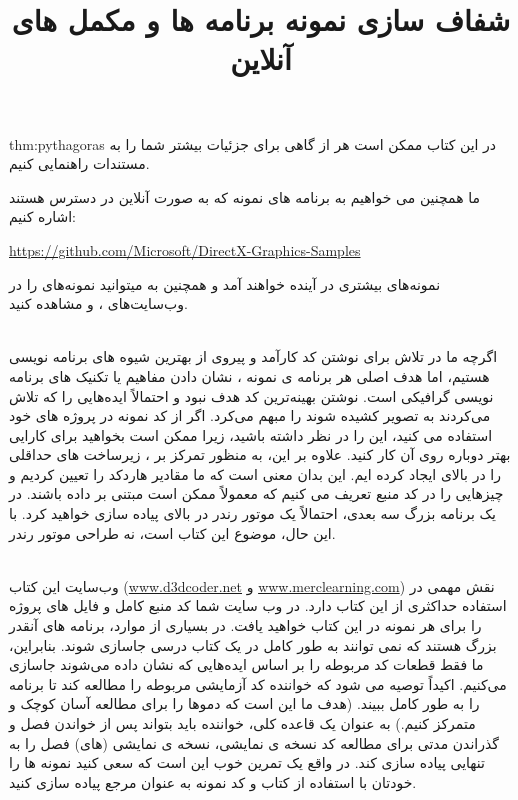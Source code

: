 {    \begin{theo}{thm:pythagoras}
        در این کتاب ممکن است هر از گاهی برای جزئیات بیشتر شما را به مستندات راهنمایی کنیم.
    \end{theo}
    ما همچنین می خواهیم به برنامه های نمونه  که به صورت آنلاین در دسترس هستند اشاره کنیم:

    \begin{flushleft}
        \href{https://github.com/Microsoft/DirectX-Graphics-Samples}{https://github.com/Microsoft/DirectX-Graphics-Samples}
    \end{flushleft}

    نمونه‌های بیشتری در آینده خواهند آمد و همچنین به میتوانید نمونه‌های  را در وب‌سایت‌های ،  و  مشاهده کنید.
} %

\title{
    \LARGE
    \textbf{شفاف سازی}
}
\\[25pt] %
{\large
اگرچه ما در تلاش برای نوشتن کد کارآمد و پیروی از بهترین شیوه های برنامه نویسی  هستیم، اما هدف اصلی هر برنامه ی نمونه ، نشان دادن مفاهیم  یا تکنیک های برنامه نویسی گرافیکی است.
نوشتن بهینه‌ترین کد هدف نبود و احتمالاً ایده‌هایی را که تلاش می‌کردند به تصویر کشیده شوند را مبهم می‌کرد.
اگر از کد نمونه در پروژه های خود استفاده می کنید، این را در نظر داشته باشید، زیرا ممکن است بخواهید برای کارایی بهتر دوباره روی آن کار کنید.
علاوه بر این، به منظور تمرکز بر ، زیرساخت های حداقلی را در بالای  ایجاد کرده ایم. این بدان معنی است که ما مقادیر هاردکد را تعیین کردیم و چیزهایی را در کد منبع تعریف می کنیم که معمولاً ممکن است مبتنی بر داده باشند.
در یک برنامه بزرگ سه بعدی، احتمالاً یک موتور رندر در بالای  پیاده سازی خواهید کرد. با این حال، موضوع این کتاب  است، نه طراحی موتور رندر.
} %

\title{
    \LARGE
    \textbf{نمونه برنامه ها و مکمل های آنلاین}
}
\\[25pt] %
{\large
وب‌سایت این کتاب (\href{www.d3dcoder.net}{www.d3dcoder.net} و \href{www.merclearning.com}{www.merclearning.com}) نقش مهمی در استفاده حداکثری از این کتاب دارد.
در وب سایت شما کد منبع کامل و فایل های پروژه را برای هر نمونه در این کتاب خواهید یافت.
در بسیاری از موارد، برنامه های  آنقدر بزرگ هستند که نمی توانند به طور کامل در یک کتاب درسی جاسازی شوند. بنابراین، ما فقط قطعات کد مربوطه را بر اساس ایده‌هایی که نشان داده می‌شوند جاسازی می‌کنیم.
اکیداً توصیه می شود که خواننده کد آزمایشی مربوطه را مطالعه کند تا برنامه را به طور کامل ببیند. (هدف ما این است که دموها را برای مطالعه آسان کوچک و متمرکز کنیم.) به عنوان یک قاعده کلی، خواننده باید بتواند پس از خواندن فصل و گذراندن مدتی برای مطالعه کد نسخه ی نمایشی، نسخه ی نمایشی (های) فصل را به تنهایی پیاده سازی کند.
در واقع یک تمرین خوب این است که سعی کنید نمونه ها را خودتان با استفاده از کتاب و کد نمونه به عنوان مرجع پیاده سازی کنید.
} %

